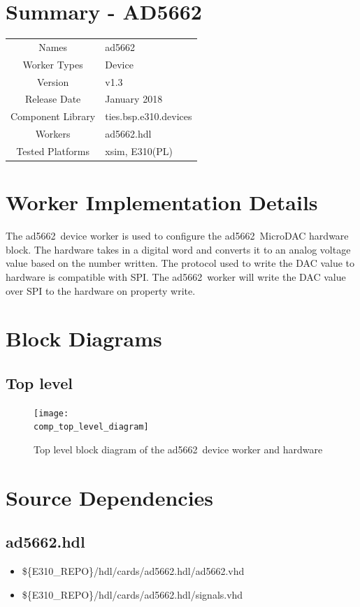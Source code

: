 \documentclass{article}
\author{} %
\date{Version \docVersion} %
\title{\docTitle}
\def\docVersion{1.3}
\def\comp{ad5662}
\def\Comp{AD5662}
\begin{document}
\section*{Summary - \Comp}
\begin{tabular}{|c|M{13.5cm}|}
	\hline
	                  &                                      \\
	\hline
	Names              & \comp                        \\
	\hline
	Worker Types       & Device \\
	\hline
	Version           & v\docVersion \\
	\hline
	Release Date      & January 2018 \\
	\hline
	Component Library & ties.bsp.e310.devices  \\
	\hline
	Workers           & \comp.hdl                \\
	\hline
	Tested Platforms  & xsim, E310(PL)                       \\
	\hline
\end{tabular}

\section*{Worker Implementation Details}
The \comp\ device worker is used to configure the \comp\ MicroDAC hardware block. The hardware takes in a digital word and converts it to an analog voltage value based on the number written. The protocol used to write the DAC value to hardware is compatible with SPI. The \comp\ worker will write the DAC value over SPI to the hardware on property write.
\section*{Block Diagrams}
\subsection*{Top level}
\begin{figure}[ht]
	\centerline{\texttt{[image: \\comp\_top\_level\_diagram]}}
	\caption{Top level block diagram of the \comp\ device worker and hardware}
	\label{fig:tb}
\end{figure}
\flushleft
\section*{Source Dependencies}
\subsection*{\comp.hdl}
\begin{itemize}
	\item \$\{E310\_REPO\}/hdl/cards/\comp.hdl/\comp.vhd
	\item \$\{E310\_REPO\}/hdl/cards/\comp.hdl/signals.vhd
\end{itemize}
\end{document}

